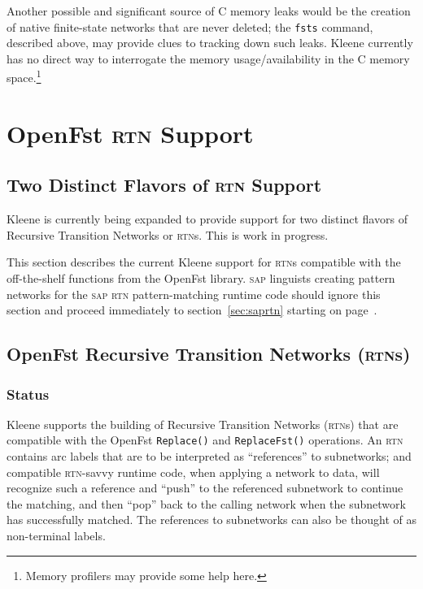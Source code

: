 \documentclass[letterpaper,12pt]{article}
\newcommand{\acro}{\textsc}
\def\CPP{{C\nolinebreak[4]\hspace{-.08em}\raisebox{.3ex}{\footnotesize\bf
+}\nolinebreak\hspace{-.1em}\raisebox{.3ex}{\footnotesize\bf +}}}
\begin{document}
Another possible and significant source of \CPP{} memory leaks would be
the creation of native finite-state networks that are never deleted; the
\texttt{fsts} command, described above, may provide clues to tracking
down such leaks.  Kleene currently has no direct way to interrogate the
memory usage/availability in the \CPP{} memory space.\footnote{Memory
profilers may provide some help here.}

\section{OpenFst \acro{rtn} Support}

\label{sec:openfstrtn}

\subsection{Two Distinct Flavors of \acro{rtn} Support}

Kleene is currently being expanded to provide support for two distinct
flavors of Recursive Transition Networks or \acro{rtn}s.  This is work in
progress.

This section describes the current Kleene support for \acro{rtn}s
compatible with the off-the-shelf functions from the OpenFst library.
\acro{sap} linguists creating pattern networks for the \acro{sap}
\acro{rtn} pattern-matching runtime code should ignore this section and
proceed immediately to section~\ref{sec:saprtn} starting on
page~\pageref{sec:saprtn}.

\subsection{OpenFst Recursive Transition Networks (\acro{rtn}s)}

\subsubsection{Status}

Kleene supports the building of Recursive Transition Networks
(\acro{rtn}s) that are compatible with the OpenFst \texttt{Replace()} and
\texttt{ReplaceFst()} operations.  An \acro{rtn} contains arc labels that
are to be interpreted as ``references'' to subnetworks; and compatible
\acro{rtn}-savvy runtime code, when applying a network to data, will
recognize such a reference and ``push'' to the referenced subnetwork to
continue the matching, and then ``pop'' back to the calling network when
the subnetwork has successfully matched.  The references to subnetworks
can also be thought of as non-terminal labels.
\end{document}
